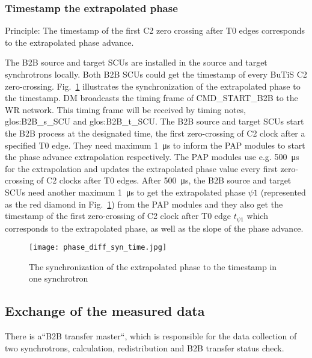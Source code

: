 \subsubsection{Timestamp the extrapolated phase}
Principle: The timestamp of the first C2 zero crossing after T0 edges corresponds to the extrapolated phase advance.

The B2B source and target SCUs are installed in the source and target synchrotrons locally. Both B2B SCUs could get the timestamp of every BuTiS C2 zero-crossing. Fig.~\ref{phase_diff_syn_time} illustrates the synchronization of the extrapolated phase to the timestamp. DM broadcasts the timing frame of CMD\_START\_B2B to the WR network. This timing frame will be received by timing notes, \gls{glos:B2B_s_SCU} and \gls{glos:B2B_t_SCU}. The B2B source and target SCUs start the B2B process at the designated time, the first zero-crossing of C2 clock after a specified T0 edge. They need maximum \SI{1}{\us} to inform the PAP modules to start the phase advance extrapolation respectively. The PAP modules use e.g. \SI{500}{\us} for the extrapolation and updates the extrapolated phase value every first zero-crossing of C2 clocks after T0 edges. After \SI{500}{\us}, the B2B source and target SCUs need another maximum \SI{1}{\us} to get the extrapolated phase $\psi1$ (represented as the red diamond in Fig.~\ref{phase_diff_syn_time}) from the PAP modules and they also get the timestamp of the first zero-crossing of C2 clock after T0 edge $t_{\psi1}$ which corresponds to the extrapolated phase, as well as the slope of the phase advance.  
 \begin{figure}[!htb]
   \centering   
   \texttt{[image: phase\_diff\_syn\_time.jpg]}
   \caption{The synchronization of the extrapolated phase to the timestamp in one synchrotron}
   \label{phase_diff_syn_time}
\end{figure}
\subsection{Exchange of the measured data}

There is a“B2B transfer master“, which is responsible for the data collection of two synchrotrons, calculation, redistribution
and B2B transfer status check.  
 
